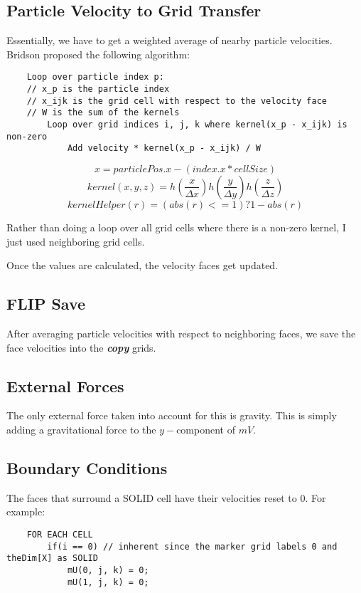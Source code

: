\documentclass[a4paper]{article}
\begin{document}
    \subsection{Particle Velocity to Grid Transfer}
    Essentially, we have to get a weighted average of nearby particle velocities. Bridson proposed the following algorithm:
    \begin{lstlisting}
    Loop over particle index p:
    // x_p is the particle index
    // x_ijk is the grid cell with respect to the velocity face
    // W is the sum of the kernels
        Loop over grid indices i, j, k where kernel(x_p - x_ijk) is non-zero
            Add velocity * kernel(x_p - x_ijk) / W
    \end{lstlisting}
    
    \[ x = particlePos.x - (index.x * cellSize)\]
    \[ kernel(x, y, z) = h(\frac{x}{\Delta x}) h(\frac{y}{\Delta y}) h(\frac{z}{\Delta z}) \]
    \[ kernelHelper(r) = (abs(r) <= 1) ? 1 - abs(r) \]
    
    \noindent Rather than doing a loop over all grid cells where there is a non-zero kernel, I just used neighboring grid cells.
    
    \noindent Once the values are calculated, the velocity faces get updated.
    
    \subsection{FLIP Save}
    After averaging particle velocities with respect to neighboring faces, we save the face velocities into the \textbf{\textit{copy}} grids.
    
    \subsection{External Forces}
    The only external force taken into account for this is gravity. This is simply adding a gravitational force to the $y-$component of $mV$.
    
    \subsection{Boundary Conditions}
    The faces that surround a SOLID cell have their velocities reset to 0. For example:
    \begin{lstlisting}
    FOR EACH CELL
        if(i == 0) // inherent since the marker grid labels 0 and theDim[X] as SOLID
            mU(0, j, k) = 0;
            mU(1, j, k) = 0;
    \end{lstlisting}
    
\end{document}

